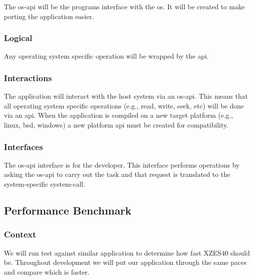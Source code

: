 The \gls{os-api} will be the programs interface with the \gls{os}.
It will be created to make porting the application easier. 

\subsubsection{Logical}

Any operating system specific operation will be wrapped by the \gls{api}.

\subsubsection{Interactions}

The application will interact with the host system via an \gls{os-api}.
This means that all operating system specific operations (e.g., read, write, seek, etc) will be done via an \gls{api}.
When the application is compiled on a new target platform (e.g., \gls{linux}, \gls{bsd}, \gls{windows}) a new platform \gls{api} must be created for compatibility.

\subsubsection{Interfaces}

The \gls{os-api} interface is for the developer.
This interface performs operations by asking the \gls{os-api} to carry out the task and that request is translated to the system-specific system-call. 

\subsection{Performance Benchmark}
\label{performance-benchmark}

\subsubsection{Context}

We will run test against similar application to determine how fast XZES40 should be.
Throughout development we will put our application through the same paces and compare which is faster.

